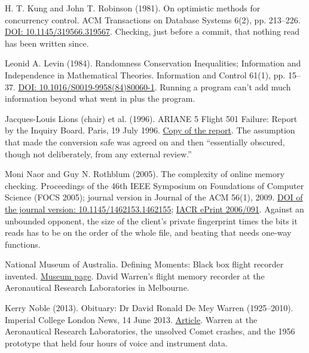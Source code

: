\documentclass[11pt,twoside]{article}
\theoremstyle{thielethm}
\theoremstyle{thieledef}
\theoremstyle{thieledef}
\theoremstyle{thieledef}
\theoremstyle{thielethm}
\theoremstyle{thieleobs}
\theoremstyle{thielethm}
\begin{document}
\noindent H. T. Kung and John T. Robinson (1981). On optimistic methods for concurrency control. ACM Transactions on Database Systems 6(2), pp. 213--226. \href{https://doi.org/10.1145/319566.319567}{DOI: 10.1145/319566.319567}. Checking, just before a commit, that nothing read has been written since.
\par\medskip

\noindent Leonid A. Levin (1984). Randomness Conservation Inequalities; Information and Independence in Mathematical Theories. Information and Control 61(1), pp. 15--37. \href{https://doi.org/10.1016/S0019-9958(84)80060-1}{DOI: 10.1016/S0019-9958(84)80060-1}. Running a program can't add much information beyond what went in plus the program.
\par\medskip

\noindent Jacques-Louis Lions (chair) et al. (1996). ARIANE 5 Flight 501 Failure: Report by the Inquiry Board. Paris, 19 July 1996. \href{https://www-users.cse.umn.edu/~arnold/disasters/ariane5rep.html}{Copy of the report}. The assumption that made the conversion safe was agreed on and then ``essentially obscured, though not deliberately, from any external review.''
\par\medskip

\noindent Moni Naor and Guy N. Rothblum (2005). The complexity of online memory checking. Proceedings of the 46th IEEE Symposium on Foundations of Computer Science (FOCS 2005); journal version in Journal of the ACM 56(1), 2009. \href{https://doi.org/10.1145/1462153.1462155}{DOI of the journal version: 10.1145/1462153.1462155}; \href{https://eprint.iacr.org/2006/091}{IACR ePrint 2006/091}. Against an unbounded opponent, the size of the client's private fingerprint times the bits it reads has to be on the order of the whole file, and beating that needs one-way functions.
\par\medskip

\noindent National Museum of Australia. Defining Moments: Black box flight recorder invented. \href{https://www.nma.gov.au/defining-moments/resources/black-box-invented}{Museum page}. David Warren's flight memory recorder at the Aeronautical Research Laboratories in Melbourne.
\par\medskip

\noindent Kerry Noble (2013). Obituary: Dr David Ronald De Mey Warren (1925--2010). Imperial College London News, 14 June 2013. \href{https://www.imperial.ac.uk/news/122905/obituary-dr-david-ronald-de-mey/}{Article}. Warren at the Aeronautical Research Laboratories, the unsolved Comet crashes, and the 1956 prototype that held four hours of voice and instrument data.
\par\medskip
\end{document}
